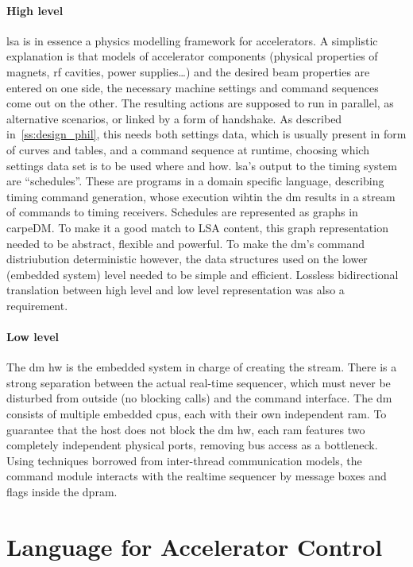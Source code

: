 \paragraph{High level}
\gls{lsa} is in essence a physics modelling framework for accelerators. A simplistic explanation is that models of accelerator components (physical properties of magnets, \gls{rf} cavities, power supplies\dots) and the desired beam properties are entered on one side, the necessary machine settings and command sequences come out on the other. The resulting actions are supposed to run in parallel, as alternative scenarios, or linked by a form of handshake.
As described in~\ref{ss:design_phil}, this needs both settings data, which is usually present in form of curves and tables, and a command sequence at runtime, choosing which settings data set is to be used where and how.
\gls{lsa}'s output to the timing system are \enquote{schedules}. These are programs in a domain specific language, describing timing command generation, whose execution wihtin the \gls{dm} results in a stream of commands to timing receivers. Schedules are represented as graphs in carpeDM. To make it a good match to LSA content, this graph representation needed to be abstract, flexible and powerful. To make the \gls{dm}'s command distriubution deterministic however, the data structures used on the lower (embedded system) level needed to be simple and efficient. Lossless bidirectional translation between high level and low level representation was also a requirement.
\paragraph{Low level}
The \gls{dm} \gls{hw} is the embedded system in charge of creating the stream. There is a strong separation between the actual real-time sequencer,
which must never be disturbed from outside (no blocking calls) and the command interface. The \gls{dm} consists of multiple embedded \gls{cpu}s, each with their own independent \gls{ram}. To guarantee that the host does not block the \gls{dm} \gls{hw}, each \gls{ram} features two completely independent physical ports, removing bus access as a bottleneck. Using techniques borrowed from inter-thread communication models, the command module interacts with the realtime sequencer by message boxes and flags inside the \gls{dpram}.
\newpage
\section{Language for Accelerator Control}

